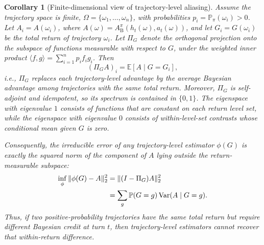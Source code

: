 \documentclass[11pt]{article}
\theoremstyle{plain}
\newtheorem{corollary}[theorem]{Corollary}
\theoremstyle{definition}
\theoremstyle{remark}
\begin{document}
\begin{corollary}[Finite-dimensional view of trajectory-level aliasing]
\label{cor:finite-spectral-aliasing}
Assume the trajectory space is finite, \(\Omega=\{\omega_1,\ldots,\omega_n\}\), with probabilities \(p_i=\mathbb{P}_\pi(\omega_i)>0\). Let \(A_i=A(\omega_i)\), where \(A(\omega)=A_{\mathrm{B}}^\pi(h_t(\omega),a_t(\omega))\), and let \(G_i=G(\omega_i)\) be the total return of trajectory \(\omega_i\). Let \(\Pi_G\) denote the orthogonal projection onto the subspace of functions measurable with respect to \(G\), under the weighted inner product \(\langle f,g\rangle=\sum_{i=1}^n p_i f_i g_i\). Then
\[
    (\Pi_G A)_i
    =
    \mathbb{E}[A\mid G=G_i],
\]
i.e., \(\Pi_G\) replaces each trajectory-level advantage by the average Bayesian advantage among trajectories with the same total return. Moreover, \(\Pi_G\) is self-adjoint and idempotent, so its spectrum is contained in \(\{0,1\}\). The eigenspace with eigenvalue \(1\) consists of functions that are constant on each return level set, while the eigenspace with eigenvalue \(0\) consists of within-level-set contrasts whose conditional mean given \(G\) is zero.

Consequently, the irreducible error of any trajectory-level estimator \(\phi(G)\) is exactly the squared norm of the component of \(A\) lying outside the return-measurable subspace:
\begin{align}
    \inf_{\phi}
    \|\phi(G)-A\|_2^2
    &\notag=
    \|(I-\Pi_G)A\|_2^2\\
    &\notag=
    \sum_g
    \mathbb{P}(G=g)\operatorname{Var}(A\mid G=g).
\end{align}
Thus, if two positive-probability trajectories have the same total return but require different Bayesian credit at turn \(t\), then trajectory-level estimators cannot recover that within-return difference.
\end{corollary}
\end{document}
